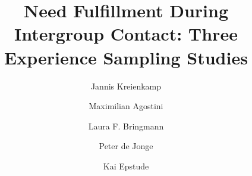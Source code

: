 \documentclass[man, 12pt, a4paper, donotrepeattitle]{apa7}
\title{Need Fulfillment During Intergroup Contact: Three Experience Sampling Studies\\}
\author[*,1]{Jannis Kreienkamp}
\author[1]{Maximilian Agostini}
\author[1]{Laura F. Bringmann}
\author[1]{Peter de Jonge}
\author[1]{Kai Epstude}
\affiliation{\hfill}
\affil[1]{University of Groningen, Department of Psychology}
\begin{document}

\makeatletter
\vspace*{3em}
\begin{center}
\noindent \textbf\@title
\vspace{1em}
\noindent \@author
\end{center}
\vspace{5em}
\begin{center}%
    \textbf\acksname%
\end{center}%
\vspace{-1em}
\protect\raggedright
\setlength{\parindent}{0.5in}
\indent\par\@acks%

\printbibliography
\end{document}
